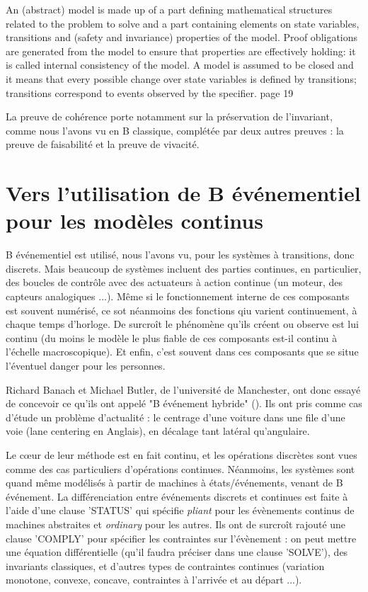 \documentclass[10pt,a4paper]{article}
\begin{document}
{An (abstract) model is made up of a part defining mathematical structures
related to the problem to solve and a part containing elements on state variables,
transitions and (safety and invariance) properties of the model. Proof obligations
are generated from the model to ensure that properties are effectively holding: it
is called internal consistency of the model. A model is assumed to be closed and
it means that every possible change over state variables is defined by transitions;
transitions correspond to events observed by the specifier.
page 19


La preuve de cohérence porte
notamment sur la préservation de l'invariant, comme nous l’avons
vu en B classique, complétée par deux autres preuves : la preuve
de faisabilité et la preuve de vivacité.\cite{dossierTechnique}
\fi

\section{Vers l'utilisation de B événementiel pour les modèles continus}

B événementiel est utilisé, nous l'avons vu, pour les systèmes à transitions, donc discrets. Mais beaucoup de systèmes incluent des parties continues, en particulier, des boucles de contrôle avec des actuateurs à action continue (un moteur, des capteurs analogiques ...). Même si le fonctionnement interne de ces composants est souvent numérisé, ce sot néanmoins des fonctions qiu varient continuement, à chaque temps d'horloge. De surcroît le phénomène qu'ils créent ou observe est lui continu (du moins le modèle le plus fiable de ces composants est-il continu à l'échelle macroscopique). Et enfin, c'est souvent dans ces composants que se situe l'éventuel danger pour les personnes.

Richard Banach et Michael Butler, de l'université de Manchester, ont donc essayé de concevoir ce qu'ils ont appelé "B événement hybride" (\cite{hevB}). Ils ont pris comme cas d'étude un problème d'actualité : le centrage d'une voiture dans une file d'une voie (lane centering en Anglais), en décalage tant latéral qu'angulaire.

Le cœur de leur méthode est en fait continu, et les opérations discrètes sont vues comme des cas particuliers d'opérations continues. Néanmoins, les systèmes sont quand même modélisés à partir de machines à états/événements, venant de B événement. La différenciation entre événements discrets et continues est faite à l'aide d'une clause 'STATUS' qui spécifie \emph{pliant} pour les évènements continus de machines abstraites et \emph{ordinary} pour les autres. Ils ont de surcroît rajouté une clause 'COMPLY' pour spécifier les contraintes sur l'évènement : on peut mettre une équation différentielle (qu'il faudra préciser dans une clause 'SOLVE'), des invariants classiques, et d'autres types de contraintes continues (variation monotone, convexe, concave, contraintes à l'arrivée et au départ ...).

}
\end{document}

